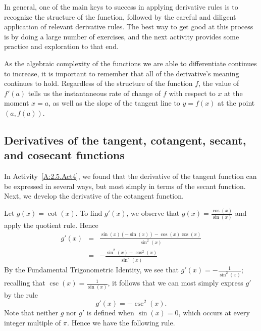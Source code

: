 In general, one of the main keys to success in applying derivative rules is to recognize the structure of the function, followed by the careful and diligent application of relevant derivative rules.  The best way to get good at this process is by doing a large number of exercises, and the next activity provides some practice and exploration to that end.


As the algebraic complexity of the functions we are able to differentiate continues to increase, it is important to remember that all of the derivative's meaning continues to hold.  Regardless of the structure of the function $f$, the value of $f'(a)$ tells us the instantaneous rate of change of $f$ with respect to $x$ at the moment $x = a$, as well as the slope of the tangent line to $y = f(x)$ at the point $(a,f(a))$.

\subsection*{Derivatives of the tangent, cotangent, secant, and cosecant functions}   


In Activity~\ref{A:2.5.Act4}, we found that the derivative of the tangent function can be expressed in several ways, but most simply in terms of the secant function.  Next, we develop the derivative of the cotangent function.

Let $g(x) = \cot(x)$.  To find $g'(x)$, we observe that $g(x) = \frac{\cos(x)}{\sin(x)}$ and apply the quotient rule.  Hence
\begin{eqnarray*}
	g'(x) & = & \frac{\sin(x)(-\sin(x)) - \cos(x) \cos(x)}{\sin^2(x)} \\
	        & = & -\frac{\sin^2(x) + \cos^2(x)}{\sin^2(x)}
\end{eqnarray*}
By the Fundamental Trigonometric Identity, we see that $g'(x) = -\frac{1}{\sin^2(x)}$; recalling that $\csc(x) = \frac{1}{\sin(x)}$, it follows that we can most simply express $g'$ by the rule
$$g'(x) = -\csc^2(x).$$
Note that neither $g$ nor $g'$ is defined when $\sin(x) = 0$, which occurs at every integer multiple of $\pi$.  Hence we have the following rule.


